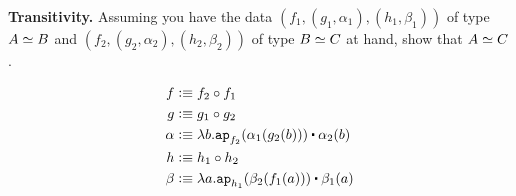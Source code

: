 \documentclass[12pt]{article}
\newcommand{\cut}[1]{}
\newcommand{\marksolution}[1]{\color{FireBrick}#1\normalcolor}%
\newcommand{\marksolution}[1]{\cut{#1}}%
\newenvironment{solution}{\trivlist \item[\hskip \labelsep{\bf
Solution:}]}{\endtrivlist}
\begin{document}
\begin{task}  
\textbf{Transitivity.}
  Assuming you have
  the data
  $(f_1,(g_1,\alpha_1),(h_1,\beta_1))$ of type $A \simeq B$
  and
  $(f_2,(g_2,\alpha_2),(h_2,\beta_2))$ of type $B \simeq C$
  at hand,
  show that $A \simeq C$.
\end{task}
\marksolution{
  \begin{solution}
    \begin{align*}
      f &\defeq f_2 \comp f_1
      \\
      g &\defeq g_1 \comp g_2
      \\
      \alpha &\defeq \lambda b. \ap_{f_2}(\alpha_1(g_2(b))) \concat \alpha_2(b)
      \\
      h &\defeq h_1 \comp h_2
      \\
      \beta &\defeq \lambda a. \ap_{h_1}(\beta_2(f_1(a))) \concat \beta_1(a)
    \end{align*}
  \end{solution}
}
\end{document}

